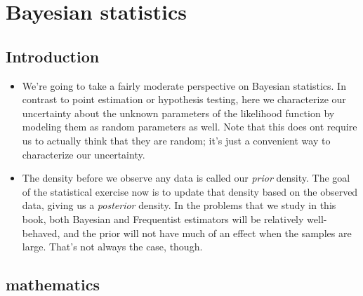 

\section{Bayesian statistics}

\subsection{Introduction}

\begin{itemize}

\item We're going to take a fairly moderate perspective on Bayesian
  statistics.  In contrast to point estimation or hypothesis testing,
  here we characterize our uncertainty about the unknown parameters of
  the likelihood function by modeling them as random parameters as
  well.  Note that this does ont require us to actually think that
  they are random; it's just a convenient way to characterize our
  uncertainty.

\item The density before we observe any data is called our
  \emph{prior} density.  The goal of the statistical exercise now is
  to update that density based on the observed data, giving us a
  \emph{posterior} density.  In the problems that we study in this
  book, both Bayesian and Frequentist estimators will be relatively
  well-behaved, and the prior will not have much of an effect when the
  samples are large.  That's not always the case, though.

\end{itemize}

\subsection{mathematics}

